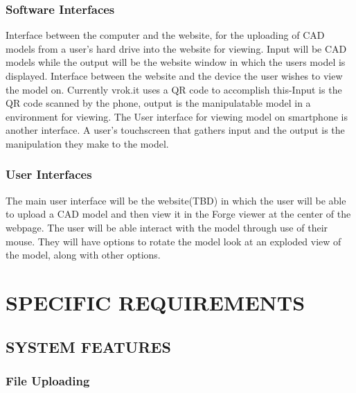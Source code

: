 \documentclass[letterpaper, 10pt, draftclsnofoot, compsoc, onecolumn]{IEEEtran}
\begin{document}
\subsubsection{Software Interfaces}
	Interface between the computer and the website, for the uploading of CAD models from a user's hard drive into the 
	website for viewing. Input will be CAD models while the output will be the website window in which the users model 
	is displayed. Interface between the website and the device the user wishes to view the model on. Currently vrok.it uses a 
	QR code to accomplish this-Input is the QR code scanned by the phone, output is the manipulatable model in a environment 
	for viewing. The User interface for viewing model on smartphone is another interface. A user's touchscreen that gathers 
	input and the output is the manipulation they make to the model.

\subsubsection{User Interfaces}
	The main user interface will be the website(TBD) in which the user will be able to upload a CAD model and then view it in 
	the Forge viewer at the center of the webpage. The user will be able interact with the model through use of their 
	mouse. They will have options to rotate the model look at an exploded view of the model, along with other options. 

\section{SPECIFIC REQUIREMENTS}
\bigskip

\subsection{SYSTEM FEATURES}
\medskip

\subsubsection{File Uploading}
\end{document}
